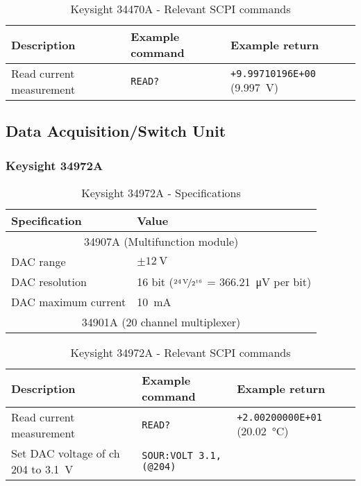 \begin{table}[H]
	\centering
	\caption{Keysight 34470A - Relevant SCPI commands}
	\label{tab:keysight-34470A-scpi}
	\begin{tabularx}{\textwidth}{Xll}
		\toprule
		\textbf{Description} & \textbf{Example command} & \textbf{Example return}\\
		\midrule
		Read current measurement & \texttt{READ?} & \texttt{+9.99710196E+00} (\SI{9.997}{\volt})\\
		\bottomrule
	\end{tabularx}
\end{table}

\subsection{Data Acquisition/Switch Unit}
\subsubsection{Keysight 34972A}\label{app:keysight-34972A}
\begin{table}[H]
	\centering
	\caption{Keysight 34972A - Specifications}
	\label{tab:keysight-34972A-specs}
	\begin{tabularx}{\textwidth}{ll}
		\toprule
		\textbf{Specification} & \textbf{Value}\\
		\midrule
		\multicolumn{2}{c}{34907A (Multifunction module)}\\
		DAC range & $\pm \SI{12}{\volt}$ \\
		DAC resolution & 16 bit ($\nicefrac{\SI{24}{\volt}}{2^{16}}$ = \SI{366.21}{\micro\volt} per bit) \\
		DAC maximum current & \SI{10}{\mA} \\
		\multicolumn{2}{c}{34901A (20 channel multiplexer)}\\
		\bottomrule
	\end{tabularx}
\end{table}

\begin{table}[H]
	\centering
	\caption{Keysight 34972A - Relevant SCPI commands}
	\label{tab:keysight-34972A-scpi}
	\begin{tabularx}{\textwidth}{Xll}
		\toprule
		\textbf{Description} & \textbf{Example command} & \textbf{Example return}\\
		\midrule
		Read current measurement & \texttt{READ?} & \texttt{+2.00200000E+01} (\SI{20.02}{\degreeCelsius})\\
		Set DAC voltage of ch 204 to \SI{3.1}{\volt} & \texttt{SOUR:VOLT 3.1,(@204)} & \\
		\bottomrule
	\end{tabularx}
\end{table}


